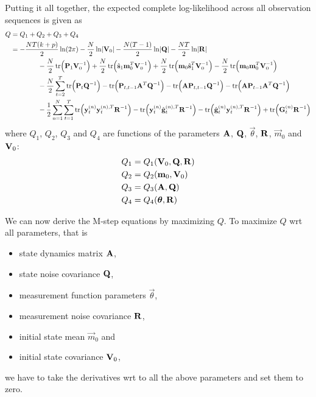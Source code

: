 		Putting it all together, the expected complete log-likelihood across all observation sequences is given as
		\begin{align*}
			Q
				&= Q_1 + Q_2 + Q_3 + Q_4 \\
				&= -\frac{NT(k + p)}{2} \ln(2\pi) - \frac{N}{2} \ln \lvert \mat{V}_0 \rvert - \frac{N(T - 1)}{2} \ln \lvert \mat{Q} \rvert - \frac{NT}{2} \ln \lvert \mat{R} \rvert \\
				&\qquad\qquad -\frac{N}{2} \tr\!\Big( \mat{P}_1 \mat{V}_0^{-1} \Big) + \frac{N}{2} \tr\!\Big( \hat{\vec{s}}_1 \vec{m}_0^T \mat{V}_0^{-1} \Big) + \frac{N}{2} \tr\!\Big( \vec{m}_0 \hat{\vec{s}}_1^T \mat{V}_0^{-1} \Big) - \frac{N}{2} \tr\!\Big(\vec{m}_0 \vec{m}_0^T \mat{V}_0^{-1} \Big) \\
				&\qquad\qquad -\frac{N}{2} \sum_{t = 2}^{T} \tr\!\Big( \mat{P}_t \mat{Q}^{-1} \Big) - \tr\!\Big( \mat{P}_{t, t - 1} \mat{A}^T \mat{Q}^{-1} \Big) - \tr\!\Big( \mat{A} \mat{P}_{t, t - 1} \mat{Q}^{-1} \Big) - \tr\!\Big( \mat{A} \mat{P}_{t - 1} \mat{A}^T \mat{Q}^{-1} \Big) \\
				&\qquad\qquad -\frac{1}{2} \sum_{n = 1}^{N} \sum_{t = 1}^{T} \tr\!\Big( \vec{y}_t^{(n)} \vec{y}_t^{(n), T} \mat{R}^{-1} \Big) - \tr\!\Big( \vec{y}_t^{(n)} \hat{\vec{g}}_t^{(n), T} \mat{R}^{-1} \Big) - \tr\!\Big( \hat{\vec{g}}_t^{(n)} \vec{y}_t^{(n), T} \mat{R}^{-1} \Big) + \tr\!\Big( \mat{G}_t^{(n)} \mat{R}^{-1} \Big)
		\end{align*}
		where \( Q_1 \), \( Q_2 \), \( Q_3 \) and \( Q_4 \) are functions of the parameters \( \boldsymbol{\mathrm{A}} \), \( \boldsymbol{\mathrm{Q}} \), \( \vec{\theta} \), \( \boldsymbol{\mathrm{R}} \), \( \vec{m}_0 \) and \( \boldsymbol{\mathrm{V}}_0 \):
		\begin{align*}
			Q_1 &= Q_1(\boldsymbol{\mathrm{V}}_0, \boldsymbol{\mathrm{Q}}, \boldsymbol{\mathrm{R}}) \\
			Q_2 &= Q_2(\boldsymbol{\mathrm{m}}_0, \boldsymbol{\mathrm{V}}_0) \\
			Q_3 &= Q_3(\boldsymbol{\mathrm{A}}, \boldsymbol{\mathrm{Q}}) \\
			Q_4 &= Q_4(\boldsymbol{\mathrm{\theta}}, \boldsymbol{\mathrm{R}})
		\end{align*}

		We can now derive the M-step equations by maximizing \(Q\). To maximize \(Q\) \ac{wrt} all parameters, that is
		\begin{itemize}
			\item state dynamics matrix \(\boldsymbol{\mathrm{A}}\),
			\item state noise covariance \(\boldsymbol{\mathrm{Q}}\),
			\item measurement function parameters \(\vec{\theta}\),
			\item measurement noise covariance \(\boldsymbol{\mathrm{R}}\),
			\item initial state mean \(\vec{m}_0\) and
			\item initial state covariance \(\boldsymbol{\mathrm{V}}_0\),
		\end{itemize}
		we have to take the derivatives \ac{wrt} to all the above parameters and set them to zero.


